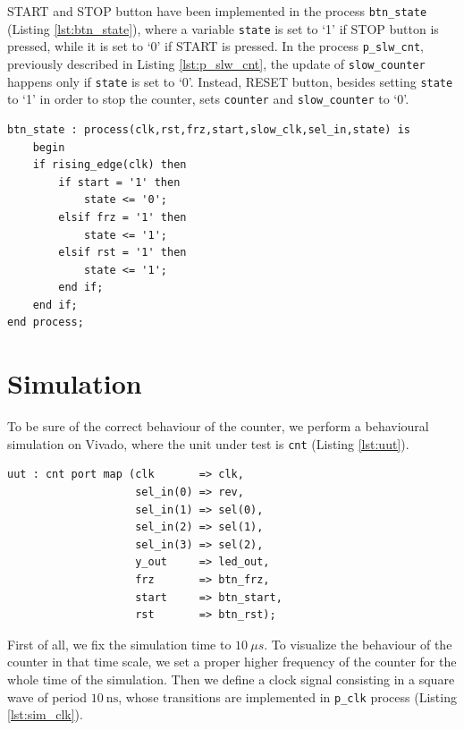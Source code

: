 \documentclass[11pt, a4paper]{article}
\begin{document}
START and STOP button have been implemented in the process {\footnotesize\texttt{btn\_state}} (Listing \ref{lst:btn_state}), where a variable {\footnotesize\texttt{state}} is set to ‘1’ if STOP button is pressed, while it is set to ‘0’ if START is pressed.
In the process {\footnotesize\texttt{p\_slw\_cnt}}, previously described in Listing \ref{lst:p_slw_cnt}, the update of {\footnotesize\texttt{slow\_counter}} happens only if {\footnotesize\texttt{state}} is set to ‘0’. Instead, RESET button, besides setting {\footnotesize\texttt{state}} to ‘1’ in order to stop the counter, sets {\footnotesize\texttt{counter}} and {\footnotesize\texttt{slow\_counter}} to ‘0’.

\begin{lstlisting}[style=vhdl,label={lst:btn_state},caption={{\footnotesize\texttt{btn\_state}} process.}]
btn_state : process(clk,rst,frz,start,slow_clk,sel_in,state) is
    begin
    if rising_edge(clk) then
        if start = '1' then
            state <= '0';
        elsif frz = '1' then
            state <= '1';
        elsif rst = '1' then
            state <= '1';
        end if;
    end if;
end process;\end{lstlisting}





\section{Simulation}
To be sure of the correct behaviour of the counter, we perform a behavioural simulation on Vivado, where the unit under test is {\footnotesize\texttt{cnt}} (Listing \ref{lst:uut}).

\begin{lstlisting}[style=vhdl,label={lst:uut},caption={Unit under test {\footnotesize\texttt{cnt}}.}]
uut : cnt port map (clk       => clk,
                    sel_in(0) => rev,
                    sel_in(1) => sel(0),
                    sel_in(2) => sel(1),
                    sel_in(3) => sel(2),
                    y_out     => led_out,
                    frz       => btn_frz,
                    start     => btn_start,
                    rst       => btn_rst);
\end{lstlisting}


First of all, we fix the simulation time to \( \SI{10}{\mu s} \). To visualize the behaviour of the counter in that time scale, we set a proper higher frequency of the counter for the whole time of the simulation. 
Then we define a clock signal consisting in a square wave of period $\SI{10}{\ns}$, whose transitions are implemented in {\footnotesize\texttt{p\_clk}} process (Listing \ref{lst:sim_clk}).
\end{document}
